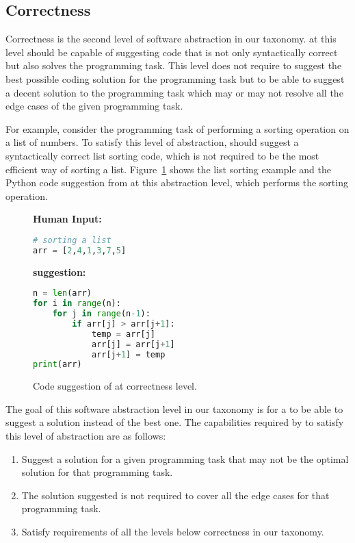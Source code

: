\subsection{Correctness}
\label{correctness}
Correctness is the second level of software abstraction in our taxonomy. 
\cct{} at this level should be capable of suggesting code that is not only syntactically correct but also solves the programming task. 
This level does not require \cct{} to suggest the best possible coding solution for the programming task but to be able to suggest a decent solution to the programming task which may or may not resolve all the edge cases of the given programming task.

For example, consider the programming task of performing a sorting operation on a list of numbers. To satisfy this level of abstraction, \cct{} should suggest a syntactically correct list sorting code, which is not required to be the most efficient way of sorting a list.
Figure~\ref{fig:correctness} shows the list sorting example and the Python code suggestion from \cct{} at this abstraction level, which performs the sorting operation.

\begin{figure}[hbt!]
    \centering
\begin{tcolorbox}[title=Correctness level suggestion for sort routine,boxsep=.15mm]
\textbf{Human Input:}
\begin{lstlisting}[language={Python}]
# sorting a list
arr = [2,4,1,3,7,5]
\end{lstlisting}
\tcbline
\textbf{\cct{} suggestion:}
\begin{lstlisting}[language={Python}]
n = len(arr)
for i in range(n):
    for j in range(n-1):
        if arr[j] > arr[j+1]:
            temp = arr[j]
            arr[j] = arr[j+1]
            arr[j+1] = temp
print(arr)
\end{lstlisting}
\end{tcolorbox}
    \caption{Code suggestion of \cct{} at correctness level.}
    \label{fig:correctness}
\end{figure}

The goal of this software abstraction level in our taxonomy is for a \cct{} to be able to suggest a solution instead of the best one.
The capabilities required by \cct{} to satisfy this level of abstraction are as follows:

\begin{enumerate}
    \item Suggest a solution for a given programming task that may not be the optimal solution for that programming task.
    \item The solution suggested is not required to cover all the edge cases for that programming task.
    \item Satisfy requirements of all the levels below correctness in our taxonomy.
\end{enumerate}

